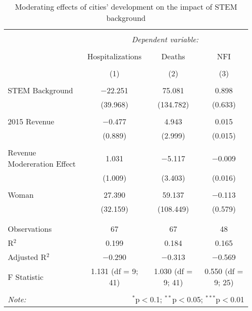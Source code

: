 
\begin{table}[!htbp] \centering 
  \caption{Moderating effects of cities’ development on the impact of STEM background} 
  \label{} 
\begin{tabular}{@{\extracolsep{5pt}}lccc} 
\\[-1.8ex]\hline 
\hline \\[-1.8ex] 
 & \multicolumn{3}{c}{\textit{Dependent variable:}} \\ 
\cline{2-4} 
\\[-1.8ex] & Hospitalizations & Deaths & NFI \\ 
\\[-1.8ex] & (1) & (2) & (3)\\ 
\hline \\[-1.8ex] 
 STEM Background & $-$22.251 & 75.081 & 0.898 \\ 
  & (39.968) & (134.782) & (0.633) \\ 
  & & & \\ 
 2015 Revenue & $-$0.477 & 4.943 & 0.015 \\ 
  & (0.889) & (2.999) & (0.015) \\ 
  & & & \\ 
 Revenue Modereration Effect & 1.031 & $-$5.117 & $-$0.009 \\ 
  & (1.009) & (3.403) & (0.016) \\ 
  & & & \\ 
 Woman & 27.390 & 59.137 & $-$0.113 \\ 
  & (32.159) & (108.449) & (0.579) \\ 
  & & & \\ 
\hline \\[-1.8ex] 
Observations & 67 & 67 & 48 \\ 
R$^{2}$ & 0.199 & 0.184 & 0.165 \\ 
Adjusted R$^{2}$ & $-$0.290 & $-$0.313 & $-$0.569 \\ 
F Statistic & 1.131 (df = 9; 41) & 1.030 (df = 9; 41) & 0.550 (df = 9; 25) \\ 
\hline 
\hline \\[-1.8ex] 
\textit{Note:}  & \multicolumn{3}{r}{$^{*}$p$<$0.1; $^{**}$p$<$0.05; $^{***}$p$<$0.01} \\ 
\end{tabular} 
\end{table} 
